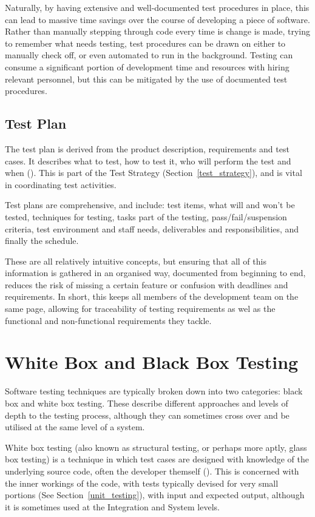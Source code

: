 \documentclass[12pt]{article}
\begin{document}
Naturally, by having extensive and well-documented test procedures in place, this can lead to massive time savings over the course of developing a piece of software. Rather than manually stepping through code every time is change is made, trying to remember what needs testing, test procedures can be drawn on either to manually check off, or even automated to run in the background. Testing can consume a significant portion of development time and resources with hiring relevant personnel, but this can be mitigated by the use of documented test procedures.


\subsection{Test Plan} \label{testplan}

The test plan is derived from the product description, requirements and test cases. It describes what to test, how to test it, who will perform the test and when (). This is part of the Test Strategy (Section~\ref{test_strategy}), and is vital in coordinating test activities.

Test plans are comprehensive, and include: test items, what will and won't be tested, techniques for testing, tasks part of the testing, pass/fail/suspension criteria, test environment and staff needs, deliverables and responsibilities, and finally the schedule. 

These are all relatively intuitive concepts, but ensuring that all of this information is gathered in an organised way, documented from beginning to end, reduces the risk of missing a certain feature or confusion with deadlines and requirements. In short, this keeps all members of the development team on the same page, allowing for traceability of testing requirements as wel as the functional and non-functional requirements they tackle.



\section{White Box and Black Box Testing} \label{blackwhitebox}

Software testing techniques are typically broken down into two categories: black box and white box testing. These describe different approaches and levels of depth to the testing process, although they can sometimes cross over and be utilised at the same level of a system.

White box testing (also known as structural testing, or perhaps more aptly, glass box testing) is a technique in which test cases are designed with knowledge of the underlying source code, often the developer themself (). This is concerned with the inner workings of the code, with tests typically devised for very small portions (See Section~\ref{unit_testing}), with input and expected output, although it is sometimes used at the Integration and System levels.
\end{document}
